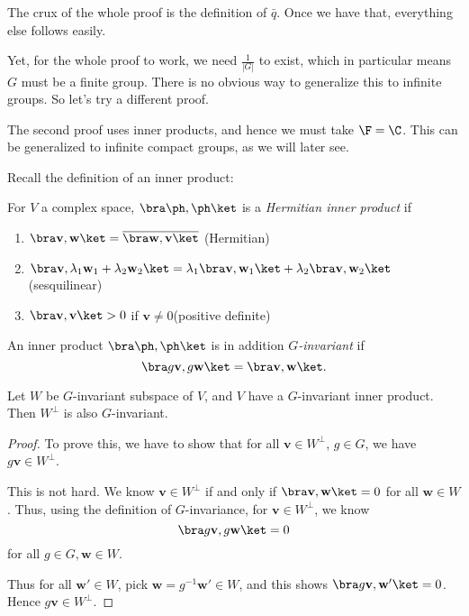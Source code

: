\documentclass[a4paper]{article}
\begin{document}
The crux of the whole proof is the definition of $\bar{q}$. Once we have that, everything else follows easily.

Yet, for the whole proof to work, we need $\frac{1}{|G|}$ to exist, which in particular means $G$ must be a finite group. There is no obvious way to generalize this to infinite groups. So let's try a different proof.

The second proof uses inner products, and hence we must take $\F = \C$. This can be generalized to infinite compact groups, as we will later see.

Recall the definition of an inner product:
\begin{defi}
  For $V$ a complex space, $\bra\ph, \ph\ket$ is a \emph{Hermitian inner product} if
  \begin{enumerate}
    \item $\bra \mathbf{v}, \mathbf{w}\ket = \overline{\bra \mathbf{w}, \mathbf{v}\ket}$ \hfill (Hermitian)
    \item $\bra \mathbf{v}, \lambda_1 \mathbf{w}_1 + \lambda_2 \mathbf{w}_2\ket = \lambda_1 \bra \mathbf{v}, \mathbf{w}_1\ket + \lambda_2 \bra \mathbf{v}, \mathbf{w}_2\ket$ \hfill (sesquilinear)
    \item $\bra \mathbf{v}, \mathbf{v}\ket > 0$ if $\mathbf{v} \not= 0$\hfill (positive definite)
  \end{enumerate}
\end{defi}

\begin{defi}
  An inner product $\bra \ph, \ph \ket$ is in addition \emph{$G$-invariant} if
  \[
    \bra g\mathbf{v}, g\mathbf{w}\ket = \bra \mathbf{v}, \mathbf{w}\ket.
  \]
\end{defi}

\begin{prop}
  Let $W$ be $G$-invariant subspace of $V$, and $V$ have a $G$-invariant inner product. Then $W^\perp$ is also $G$-invariant.
\end{prop}

\begin{proof}
  To prove this, we have to show that for all $\mathbf{v} \in W^\perp$, $g \in G$, we have $g \mathbf{v} \in W^\perp$.

  This is not hard. We know $\mathbf{v} \in W^\perp$ if and only if $\bra \mathbf{v}, \mathbf{w}\ket = 0$ for all $\mathbf{w} \in W$. Thus, using the definition of $G$-invariance, for $\mathbf{v} \in W^\perp$, we know
  \[
    \bra g\mathbf{v}, g\mathbf{w}\ket = 0
  \]
  for all $g \in G, \mathbf{w}\in W$.

  Thus for all $\mathbf{w}' \in W$, pick $\mathbf{w} = g^{-1} \mathbf{w}' \in W$, and this shows $\bra g\mathbf{v}, \mathbf{w}'\ket = 0$. Hence $g\mathbf{v} \in W^\perp$.
\end{proof}
\end{document}
